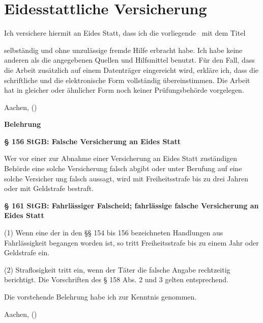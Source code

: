 \chapter*{Eidesstattliche Versicherung}
\thispagestyle{empty}
\begin{small}
\noindent Ich versichere hiermit an Eides Statt, dass ich die vorliegende \THESISTYPE\ mit dem Titel
\begin{center}
  \TITLEENG
\end{center}
\noindent selbständig und ohne unzulässige fremde Hilfe erbracht habe. Ich habe keine anderen als die angegebenen Quellen und Hilfsmittel benutzt. Für den Fall, dass die Arbeit zusätzlich auf einem Datenträger eingereicht wird, erkläre ich, dass die schriftliche und die elektronische Form vollständig übereinstimmen. Die Arbeit hat in gleicher oder ähnlicher Form noch keiner Prüfungsbehörde vorgelegen.
\vspace{3\baselineskip}

\noindent Aachen, \DATE \hfill (\AUTHOR)

\vfill
\noindent \textbf{Belehrung}
\vspace{1\baselineskip}

\noindent \textbf{§ 156 StGB: Falsche Versicherung an Eides Statt}

\noindent Wer vor einer zur Abnahme einer Versicherung an Eides Statt zuständigen Behörde eine solche Versicherung falsch abgibt oder unter Berufung auf eine solche Versicher ung falsch aussagt, wird mit Freiheitsstrafe bis zu drei Jahren oder mit Geldstrafe bestraft.
\vspace{1\baselineskip}

\noindent \textbf{§ 161 StGB: Fahrlässiger Falscheid; fahrlässige falsche Versicherung an Eides Statt}

\noindent (1) Wenn eine der in den §§ 154 bis 156 bezeichneten Handlungen aus Fahrlässigkeit begangen worden ist, so tritt Freiheitsstrafe bis zu einem Jahr oder Geldstrafe ein.

\noindent (2) Straflosigkeit tritt ein, wenn der Täter die falsche Angabe rechtzeitig berichtigt. Die Vorschriften des § 158 Abs. 2 und 3 gelten entsprechend.
\vspace{1\baselineskip}

\noindent Die vorstehende Belehrung habe ich zur Kenntnis genommen.
\vspace{3\baselineskip}

\noindent Aachen, \DATE \hfill (\AUTHOR)
\end{small} 